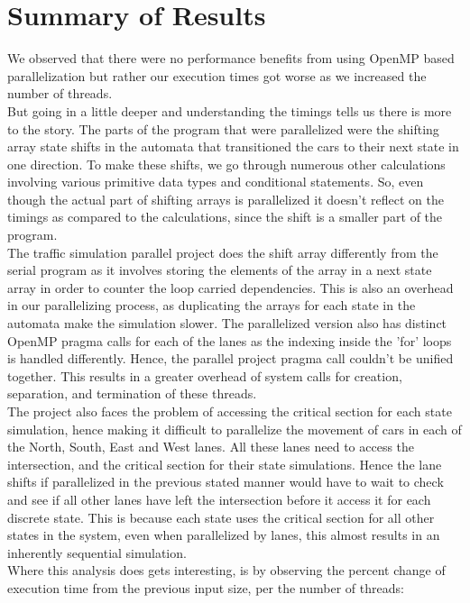 \documentclass[conference]{IEEEtran}
\begin{document}
\section{Summary of Results}
We observed that there were no performance benefits from using OpenMP based parallelization but rather our execution times got worse as we increased the number of threads. \\
\hspace*{.2cm}But going in a little deeper and understanding the timings tells us there is more to the story. The parts of the program that were parallelized were the shifting array state shifts in the automata that transitioned the cars to their next state in one direction. To make these shifts, we go through numerous other calculations involving various primitive data types and conditional statements. So, even though the actual part of shifting arrays is parallelized it doesn't reflect on the timings as compared to the calculations, since the shift is a smaller part of the program. \\
\hspace*{.2cm}The traffic simulation parallel project does the shift array differently from the serial program as it involves storing the elements of the array in a next state array in order to counter the loop carried dependencies. This is also an overhead in our parallelizing process, as duplicating the arrays for each state in the automata make the simulation slower. The parallelized version also has distinct OpenMP pragma calls for each of the lanes as the indexing inside the 'for' loops is handled differently. Hence, the parallel project pragma call couldn't be unified together. This results in a greater overhead of system calls for creation, separation, and termination of these threads. \\
\hspace*{.2cm}The project also faces the problem of accessing the critical section for each state simulation, hence making it difficult to parallelize the movement of cars in each of the North, South, East and West lanes. All these lanes need to access the intersection, and the critical section for their state simulations. Hence the lane shifts if parallelized in the previous stated manner would have to wait to check and see if all other lanes have left the intersection before it access it for each discrete state. This is because each state uses the critical section for all other states in the system, even when parallelized by lanes, this almost results in an inherently sequential simulation. \\
\hspace*{.2cm}Where this analysis does gets interesting, is by observing the percent change of execution time from the previous input size, per the number of threads: \\
\end{document}
